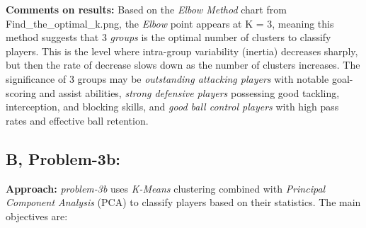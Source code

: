 \documentclass[12pt]{article}
\begin{document}
\textbf{Comments on results:} Based on the \textit{Elbow Method} chart from Find\_the\_optimal\_k.png, the \textit{Elbow} point appears at K = 3, meaning this method suggests that 3 \textit{groups} is the optimal number of clusters to classify players. This is the level where intra-group variability (inertia) decreases sharply, but then the rate of decrease slows down as the number of clusters increases. The significance of 3 groups may be \textit{outstanding attacking players} with notable goal-scoring and assist abilities, \textit{strong defensive players} possessing good tackling, interception, and blocking skills, and \textit{good ball control players} with high pass rates and effective ball retention.

\subsection*{B, Problem-3b:}

\textbf{Approach:} \textit{problem-3b} uses \textit{K-Means} clustering combined with \textit{Principal Component Analysis} (PCA) to classify players based on their statistics. The main objectives are:
\end{document}
